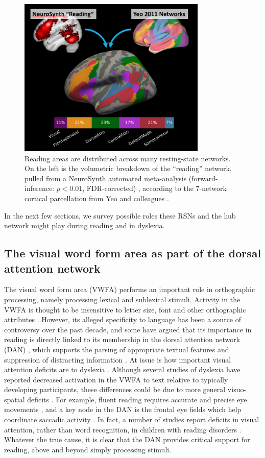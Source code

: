 \begin{figure}[t]
\centering
\includegraphics[height=3in]{images/ch1-yeo-to-neurosynth.png}
    \caption[Reading areas are distributed across many resting-state networks]{Reading areas are distributed across many resting-state networks. On the left is the volumetric breakdown of the ``reading'' network, pulled from a NeuroSynth automated meta-analysis (forward-inference: $p < 0.01$, FDR-corrected) \citep{Yarkoni2011}, according to the 7-network cortical parcellation from Yeo and colleagues \citep{Yeo2011}.}
    \label{fig:ch1-yeo-to-neurosynth}
\end{figure}

In the next few sections, we survey possible roles these RSNs and the hub network might play during reading and in dyslexia.

\subsection{The visual word form area as part of the dorsal attention network} 
The visual word form area (VWFA) performs an important role in orthographic processing, namely processing lexical and sublexical stimuli. Activity in the VWFA is thought to be insensitive to letter size, font and other orthographic attributes \citep{Cohen2002}. However, its alleged specificity to language has been a source of controversy over the past decade, and some have argued that its importance in reading is directly linked to its membership in the dorsal attention network (DAN) \citep{Vogel2012a}, which supports the parsing of appropriate textual features and suppression of distracting information \citep{Corbetta2002}. At issue is how important visual attention deficits are to dyslexia \citep{Vogel2014}. Although several studies of dyslexia have reported decreased activation in the VWFA to text relative to typically developing participants, these differences could be due to more general visuo-spatial deficits  \citep{Richlan2009}. For example, fluent reading requires accurate and precise eye movements \citep{Rayner1978}, and a key node in the DAN is the frontal eye fields which help coordinate saccadic activity \citep{Connolly2002}. In fact, a number of studies report deficits in visual attention, rather than word recognition, in children with reading disorders \citep{Vidyasagar2010}.  Whatever the true cause, it is clear that the DAN provides critical support for reading, above and beyond simply processing stimuli.

